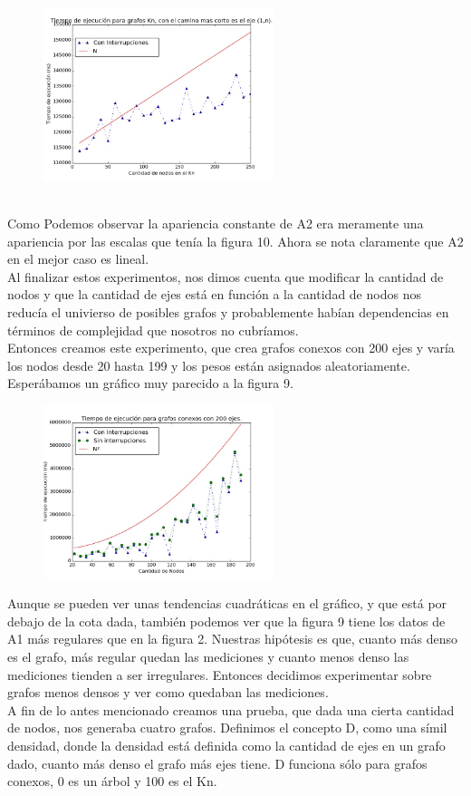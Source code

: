 \documentclass[spanish,12pt]{article}
\begin{document}
\begin{figure}[H]
\centering
\includegraphics[width=0.6\textwidth]{KnsoloOptC100r3000}
\caption{}
\end{figure}
\\
Como Podemos observar la apariencia constante de A2 era meramente una apariencia por las escalas que tenía la figura 10. Ahora se nota claramente que A2 en el mejor caso es lineal.
\\
Al finalizar estos experimentos, nos dimos cuenta que modificar la cantidad de nodos y que la cantidad de ejes está en función a la cantidad de nodos nos reducía el univierso de posibles grafos y probablemente habían dependencias en términos de complejidad que nosotros no cubríamos.
\\
 Entonces creamos este experimento, que crea grafos conexos con 200 ejes y varía los nodos desde 20 hasta 199 y los pesos están asignados aleatoriamente. Esperábamos un gráfico muy parecido a la figura 9.

\begin{figure}[H]
\centering
\includegraphics[width=0.6\textwidth]{Conexo200ejesC150r3000}
\caption{}
\end{figure}

Aunque se pueden ver unas tendencias cuadráticas en el gráfico, y que está por debajo de la cota dada, también podemos ver que la figura 9 tiene los datos de A1 más regulares que en la figura 2. Nuestras hipótesis es que, cuanto más denso es el grafo, más regular quedan las mediciones y cuanto menos denso las mediciones tienden a ser irregulares. Entonces decidimos experimentar sobre grafos menos densos y ver como quedaban las mediciones.
\\
A fin de lo antes mencionado creamos una prueba, que dada una cierta cantidad de nodos, nos generaba cuatro grafos. Definimos el concepto D, como una símil densidad, donde la densidad está definida como la cantidad de ejes en un grafo dado, cuanto más denso el grafo más ejes tiene. D funciona sólo para grafos conexos, 0 es un árbol y 100 es el Kn.
\end{document}
